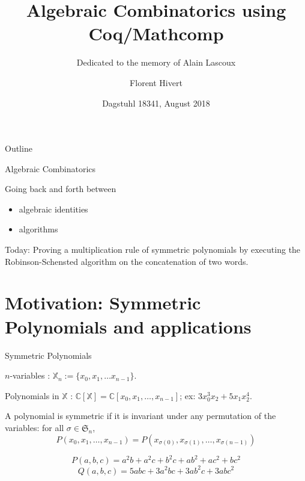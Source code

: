\documentclass[compress,11pt]{beamer}
\title{\bf\LARGE Algebraic Combinatorics using Coq/Mathcomp\\[5mm]}
\subtitle{Dedicated to the memory of Alain Lascoux}
\author{Florent Hivert}
\institute[LRI]{
  LRI / Université Paris Sud 11 / CNRS}
\date{Dagstuhl 18341, August 2018}
\newcommand{\XX}{{\mathbb X}}
\newcommand{\C}{{\mathbb C}}
\newcommand{\SG}{{\mathfrak S}}
\renewcommand{\emph}[1]{{\color{red} #1}}
\begin{document}
\frame{\titlepage}

\begin{frame}{Outline}

  \tableofcontents
\end{frame}

\begin{frame}{Algebraic Combinatorics}

\Large
Going back and forth between
\begin{itemize}
\item {\color{red}algebraic identities}
\item {\color{blue}algorithms}
\end{itemize}
\pause\bigskip

Today: Proving a {\color{red}multiplication rule} of symmetric polynomials by
{\color{blue}executing} the Robinson-Schensted algorithm on the
{\color{blue}concatenation of two words}.  \pause\bigskip

\end{frame}

\section{Motivation: Symmetric Polynomials and applications}
\begin{frame}{Symmetric Polynomials}
  
  $n$-variables : $\XX_n := \{x_0, x_1, \dots x_{n-1}\}$.

  Polynomials in $\XX$ : $\C[\XX] = \C[x_0, x_1, \dots, x_{n-1}]$; ex: $3x_0^3x_2
  + 5 x_1x_2^4$.

  \begin{DEFN}
    A polynomial is \emph{symmetric} if it is invariant under any permutation of the
    variables: for all $\sigma\in\SG_n$,
    \[P(x_0, x_1, \dots, x_{n-1}) = 
    P(x_{\sigma(0)}, x_{\sigma(1)}, \dots, x_{\sigma({n-1})})\]
  \end{DEFN}

  \[P(a,b,c) = a^2b + a^2c + b^2c + ab^2 + ac^2 + bc^2\]
  \[Q(a,b,c) = 5abc + 3a^2bc + 3ab^2c + 3abc^2\]

\end{frame}
\end{document}

